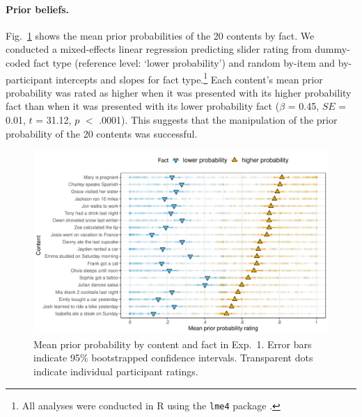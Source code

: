 \documentclass[11pt,fleqn]{article}
\newcommand{\figref}[1]{Fig.~\ref{#1}}
\newcommand{\6}{\mbox{$[\hspace*{-.6mm}[$}}
\newcommand{\9}{\mbox{$]\hspace*{-.6mm}]$}}
\begin{document}
\paragraph{Prior beliefs.}  \figref{f-prior} shows the mean prior probabilities of the 20 contents by fact. We conducted a  mixed-effects linear regression predicting slider rating from dummy-coded fact type (reference level: `lower probability') and random by-item and by-participant intercepts and slopes for fact type.\footnote{All analyses were conducted in R \cite{R} using the \texttt{lme4} package \cite{lme4}.} Each content's mean prior probability  was rated as higher when it was presented with its higher probability fact than when it was presented with its lower probability fact ($\beta$ = 0.45, $SE$ = 0.01, $t$ = 31.12, $p$ $<$ .0001). This suggests that the manipulation of the prior probability of the 20 contents was successful. 

\begin{figure}[h!]
\centering
\includegraphics[width=.7\paperwidth]{../../results/9-prior-projection/graphs/prior-ratings}

\caption{Mean prior probability by content and fact in Exp.~1. Error bars indicate 95\% bootstrapped confidence intervals. Transparent dots indicate individual participant ratings.} 
\label{f-prior}
\end{figure}
\end{document}

